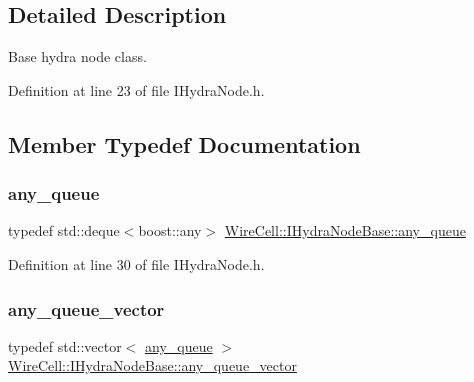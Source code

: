 \subsection{Detailed Description}
Base hydra node class. 

Definition at line 23 of file I\+Hydra\+Node.\+h.



\subsection{Member Typedef Documentation}
\mbox{\label{class_wire_cell_1_1_i_hydra_node_base_ae66b3516835d191befc31f7ad5fce5d1}} 
\subsubsection{\texorpdfstring{any\+\_\+queue}{any\_queue}}
{\footnotesize\ttfamily typedef std\+::deque$<$boost\+::any$>$ \hyperlink{class_wire_cell_1_1_i_hydra_node_base_ae66b3516835d191befc31f7ad5fce5d1}{Wire\+Cell\+::\+I\+Hydra\+Node\+Base\+::any\+\_\+queue}}



Definition at line 30 of file I\+Hydra\+Node.\+h.

\mbox{\label{class_wire_cell_1_1_i_hydra_node_base_aab191670a86f2835da2aa07ab5e6372d}} 
\subsubsection{\texorpdfstring{any\+\_\+queue\+\_\+vector}{any\_queue\_vector}}
{\footnotesize\ttfamily typedef std\+::vector$<$ \hyperlink{class_wire_cell_1_1_i_hydra_node_base_ae66b3516835d191befc31f7ad5fce5d1}{any\+\_\+queue} $>$ \hyperlink{class_wire_cell_1_1_i_hydra_node_base_aab191670a86f2835da2aa07ab5e6372d}{Wire\+Cell\+::\+I\+Hydra\+Node\+Base\+::any\+\_\+queue\+\_\+vector}}



